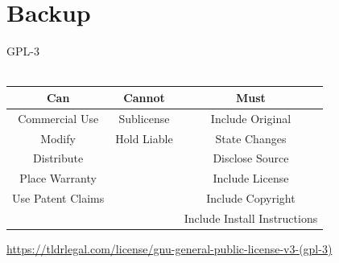 \section{Backup}




\begin{frame}{GPL-3}
	\\
	\\
	\begin{tabular}{|c|c|c|}
		\hline 
		Can & Cannot & Must \\ 
		\hline 
		Commercial Use & Sublicense & Include Original \\ 
		\hline 
		Modify & Hold Liable & State Changes \\ 
		\hline 
		Distribute &  & Disclose Source \\ 
		\hline 
		Place Warranty &  & Include License \\ 
		\hline 
		Use Patent Claims &  & Include Copyright \\ 
		\hline 
		&  & Include Install Instructions \\ 
		\hline 
	\end{tabular} 
\end{frame}
\note
{
	\url{https://tldrlegal.com/license/gnu-general-public-license-v3-(gpl-3)}
}

